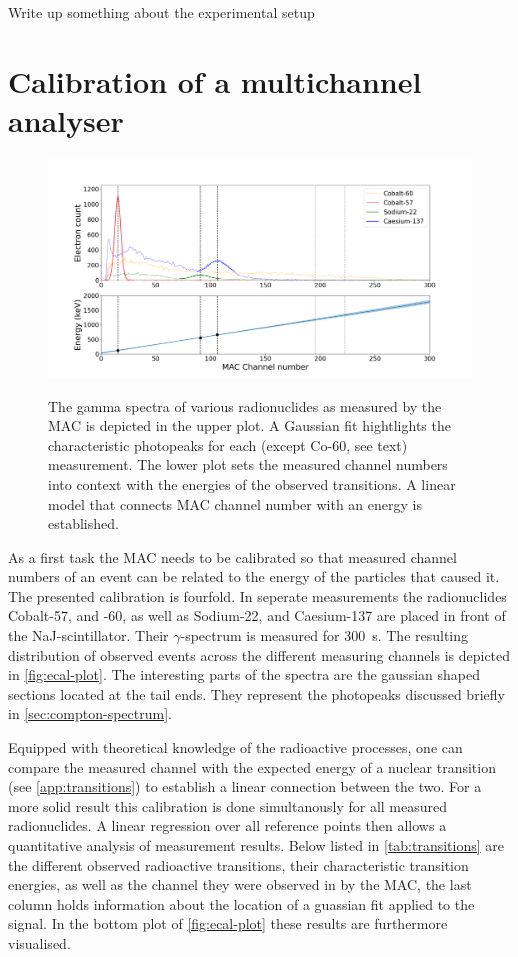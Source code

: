 
\todo Write up something about the experimental setup

\section{Calibration of a multichannel analyser}
\label{sec:ecal}

\begin{figure}
	\label{fig:ecal-plot}
	\includegraphics[width=1.0\textwidth]{./fig/ecal-plot.png}
	\caption{}{The gamma spectra of various radionuclides as measured by the MAC
	is depicted in the upper plot. A Gaussian fit hightlights the characteristic
	photopeaks for each (except Co-60, see text) measurement. The lower plot
	sets the measured channel numbers into context with the energies of the
	observed transitions. A linear model that connects MAC channel number with an
	energy is established.}
\end{figure}

As a first task the MAC needs to be calibrated so that measured channel numbers of an
event can be related to the energy of the particles that caused it. The presented
calibration is fourfold. In seperate measurements the radionuclides Cobalt-57, and
-60, as well as Sodium-22, and Caesium-137 are placed in front of the
NaJ-scintillator. Their $\gamma$-spectrum is measured for \SI{300}{\second}. The
resulting distribution of observed events across the different measuring channels is
depicted in \autoref{fig:ecal-plot}. The interesting parts of the spectra are the
gaussian shaped sections located at the tail ends. They represent the photopeaks
discussed briefly in \autoref{sec:compton-spectrum}.

Equipped with theoretical knowledge of the radioactive processes, one can compare the
measured channel with the expected energy of a nuclear transition (see \todo
\autoref{app:transitions}) to establish a linear connection between the two. For a
more solid result this calibration is done simultanously for all measured
radionuclides. A linear regression over all reference points then allows a
quantitative analysis of measurement results. Below listed in
\autoref{tab:transitions} are the different observed radioactive transitions, their
characteristic transition energies, as well as the channel they were observed in by
the MAC, the last column holds information about the location of a guassian fit
applied to the signal. In the bottom plot of \autoref{fig:ecal-plot} these results
are furthermore visualised.

